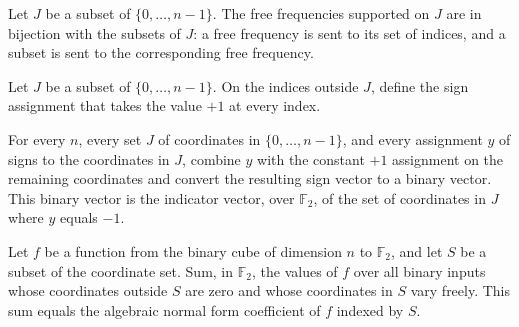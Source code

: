 \begin{definition}
\label{FABL.freeFrequencyPowersetEquiv}
\leanok
{}
Let $J$ be a subset of $\{0,\ldots,n-1\}$. The free frequencies supported on $J$ are in
bijection with the subsets of $J$: a free frequency is sent to its set of indices, and a
subset is sent to the corresponding free frequency.
\end{definition}

\begin{definition}
\label{FABL.zeroFixedSign}
\leanok
{}
Let $J$ be a subset of $\{0,\ldots,n-1\}$. On the indices outside $J$, define the sign
assignment that takes the value $+1$ at every index.
\end{definition}

\begin{theorem}
\leanok
{}
For every $n$, every set $J$ of coordinates in $\{0,\ldots,n-1\}$, and every assignment
$y$ of signs to the coordinates in $J$, combine $y$ with the constant $+1$ assignment on
the remaining coordinates and convert the resulting sign vector to a binary vector. This
binary vector is the indicator vector, over $\mathbb F_2$, of the set of coordinates in
$J$ where $y$ equals $-1$.
\end{theorem}

\begin{theorem}
\label{FABL.sum_freeSignCube_boolean_eq_anfCoeff}
\leanok
{}
Let $f$ be a function from the binary cube of dimension $n$ to $\mathbb F_2$, and let
$S$ be a subset of the coordinate set. Sum, in $\mathbb F_2$, the values of $f$ over
all binary inputs whose coordinates outside $S$ are zero and whose coordinates in $S$
vary freely. This sum equals the algebraic normal form coefficient of $f$ indexed by
$S$.
\end{theorem}

